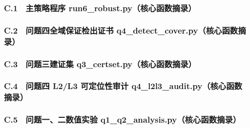 \subsubsection*{C.1　主策略程序 run6\_robust.py（核心函数摘录）}


\subsubsection*{C.2　问题四全域保证检出证书 q4\_detect\_cover.py（核心函数摘录）}


\subsubsection*{C.3　问题三建证集 q3\_certset.py（核心函数摘录）}


\subsubsection*{C.4　问题四 L2/L3 可定位性审计 q4\_l2l3\_audit.py（核心函数摘录）}


\subsubsection*{C.5　问题一、二数值实验 q1\_q2\_analysis.py（核心函数摘录）}


